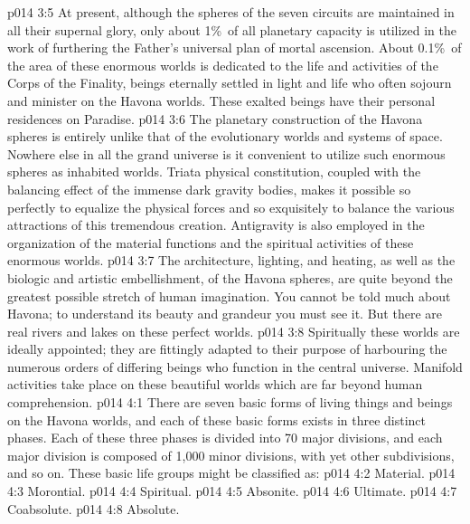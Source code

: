\vs p014 3:5 At present, although the spheres of the seven circuits are maintained in all their supernal glory, only about 1\%\ of all planetary capacity is utilized in the work of furthering the Father’s universal plan of mortal ascension. About 0.1\%\ of the area of these enormous worlds is dedicated to the life and activities of the Corps of the Finality, beings eternally settled in light and life who often sojourn and minister on the Havona worlds. These exalted beings have their personal residences on Paradise.
\vs p014 3:6 The planetary construction of the Havona spheres is entirely unlike that of the evolutionary worlds and systems of space. Nowhere else in all the grand universe is it convenient to utilize such enormous spheres as inhabited worlds. Triata physical constitution, coupled with the balancing effect of the immense dark gravity bodies, makes it possible so perfectly to equalize the physical forces and so exquisitely to balance the various attractions of this tremendous creation. Antigravity is also employed in the organization of the material functions and the spiritual activities of these enormous worlds.
\vs p014 3:7 The architecture, lighting, and heating, as well as the biologic and artistic embellishment, of the Havona spheres, are quite beyond the greatest possible stretch of human imagination. You cannot be told much about Havona; to understand its beauty and grandeur you must see it. But there are real rivers and lakes on these perfect worlds.
\vs p014 3:8 Spiritually these worlds are ideally appointed; they are fittingly adapted to their purpose of harbouring the numerous orders of differing beings who function in the central universe. Manifold activities take place on these beautiful worlds which are far beyond human comprehension.
\vs p014 4:1 There are seven basic forms of living things and beings on the Havona worlds, and each of these basic forms exists in three distinct phases. Each of these three phases is divided into 70 major divisions, and each major division is composed of 1,000 minor divisions, with yet other subdivisions, and so on. These basic life groups might be classified as:
\vs p014 4:2 \bibnobreakspace Material.
\vs p014 4:3 \bibnobreakspace Morontial.
\vs p014 4:4 \bibnobreakspace Spiritual.
\vs p014 4:5 \bibnobreakspace Absonite.
\vs p014 4:6 \bibnobreakspace Ultimate.
\vs p014 4:7 \bibnobreakspace Coabsolute.
\vs p014 4:8 \bibnobreakspace Absolute.
